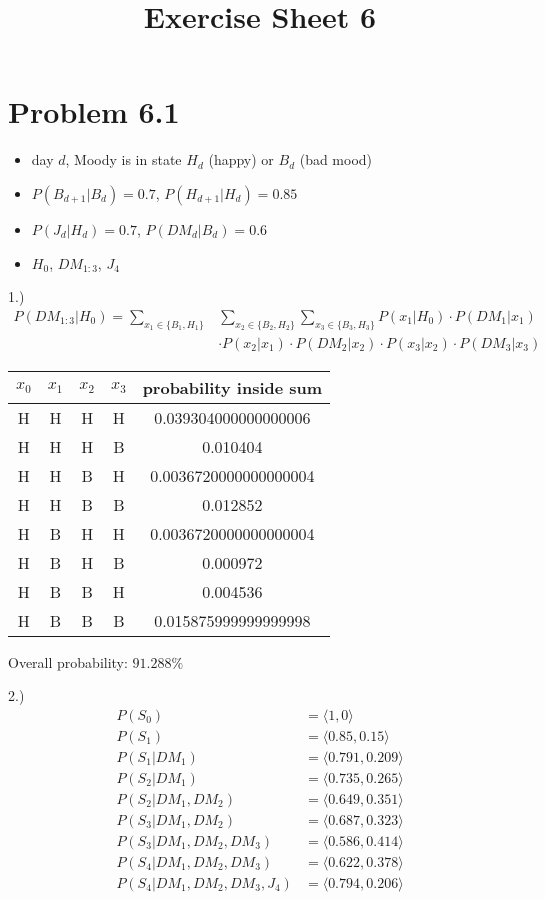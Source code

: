 \documentclass[a4paper]{article}
\title{Exercise Sheet 6}
\begin{document}
\maketitle

\section*{Problem 6.1}
\begin{itemize}
    \item
        day $d$, Moody is in state $H_d$ (happy) or $B_d$ (bad mood)
    \item
        $P(B_{d+1} | B_d) = 0.7$, $P(H_{d+1} | H_d) = 0.85$
    \item
        $P(J_d | H_d) = 0.7$, $P(DM_d | B_d) = 0.6$
    \item
        $H_0$, $DM_{1:3}$, $J_4$
\end{itemize}
1.)
\begin{align*}
    P(DM_{1:3} | H_0) = \sum_{x_1 \in \{B_1, H_1\}} &\sum_{x_{2} \in \{B_2, H_2\}} \sum_{x_{3} \in \{B_3, H_3\}} P(x_1| H_0) \cdot P(DM_1| x_1) \\
    &\cdot P(x_2| x_1) \cdot P(DM_2| x_2) \cdot P(x_3| x_2) \cdot P(DM_3| x_3)
\end{align*}

\begin{tabular}{ccccc}
    $x_0$ & $x_1$ & $x_2$ & $x_3$ & probability inside sum\\\hline
    H &  H & H & H & 0.039304000000000006\\\hline
    H & H & H & B & 0.010404\\\hline
    H & H & B & H & 0.0036720000000000004\\\hline
    H & H & B & B & 0.012852\\\hline
    H & B & H & H & 0.0036720000000000004\\\hline
    H & B & H & B & 0.000972\\\hline
    H & B & B & H & 0.004536\\\hline
    H & B & B & B & 0.015875999999999998\\\hline
\end{tabular}

Overall probability: $91.288\%$

2.)
\begin{align*}
    P(S_0) &= \langle 1, 0 \rangle\\
    P(S_1) &= \langle 0.85, 0.15 \rangle\\
    P(S_1 | DM_1) &= \langle 0.791, 0.209 \rangle\\
    P(S_2 | DM_1) &= \langle 0.735, 0.265 \rangle\\
    P(S_2 | DM_1, DM_2) &=  \langle 0.649, 0.351 \rangle\\
    P(S_3 | DM_1, DM_2) &= \langle 0.687, 0.323 \rangle\\
    P(S_3 | DM_1, DM_2, DM_3) &= \langle 0.586, 0.414 \rangle\\
    P(S_4 | DM_1, DM_2, DM_3) &= \langle 0.622, 0.378 \rangle\\
    P(S_4 | DM_1, DM_2, DM_3, J_4) &= \langle 0.794, 0.206 \rangle\\
\end{align*}
\end{document}
